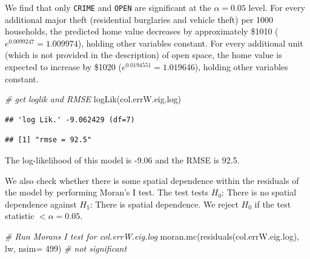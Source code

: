\documentclass[
]{article}
\newenvironment{Shaded}{\begin{snugshade}}{\end{snugshade}}
\newcommand{\AttributeTok}[1]{\textcolor[rgb]{0.77,0.63,0.00}{#1}}
\newcommand{\CommentTok}[1]{\textcolor[rgb]{0.56,0.35,0.01}{\textit{#1}}}
\newcommand{\DecValTok}[1]{\textcolor[rgb]{0.00,0.00,0.81}{#1}}
\newcommand{\FunctionTok}[1]{\textcolor[rgb]{0.00,0.00,0.00}{#1}}
\newcommand{\NormalTok}[1]{#1}
\newcommand{\SpecialCharTok}[1]{\textcolor[rgb]{0.00,0.00,0.00}{#1}}
\newcommand{\StringTok}[1]{\textcolor[rgb]{0.31,0.60,0.02}{#1}}
\begin{document}
We find that only \texttt{CRIME} and \texttt{OPEN} are significant at
the \(\alpha=0.05\) level. For every additional major theft (residential
burglaries and vehicle theft) per 1000 households, the predicted home
value decreases by approximately \$1010 (\(e^{0.0099247}=1.009974\)),
holding other variables constant. For every additional unit (which is
not provided in the description) of open space, the home value is
expected to increase by \$1020 (\(e^{0.0194551}=1.019646\)), holding
other variables constant.

\begin{Shaded}
\begin{Highlighting}[]
\CommentTok{\# get loglik and RMSE}
\FunctionTok{logLik}\NormalTok{(col.errW.eig.log)}
\end{Highlighting}
\end{Shaded}

\begin{verbatim}
## 'log Lik.' -9.062429 (df=7)
\end{verbatim}

\begin{Shaded}
\end{Shaded}

\begin{verbatim}
## [1] "rmse = 92.5"
\end{verbatim}

The log-likelihood of this model is -9.06 and the RMSE is 92.5.

We also check whether there is some spatial dependence within the
residuals of the model by performing Moran's I test. The test tests
\(H_0\): There is no spatial dependence against \(H_1\): There is
spatial dependence. We reject \(H_0\) if the test statistic
\(<\alpha=0.05\).

\begin{Shaded}
\begin{Highlighting}[]
\CommentTok{\# Run Moran\textquotesingle{}s I test for col.errW.eig.log}
\FunctionTok{moran.mc}\NormalTok{(}\FunctionTok{residuals}\NormalTok{(col.errW.eig.log), lw, }\AttributeTok{nsim=} \DecValTok{499}\NormalTok{) }\CommentTok{\# not significant}
\end{Highlighting}
\end{Shaded}
\end{document}
